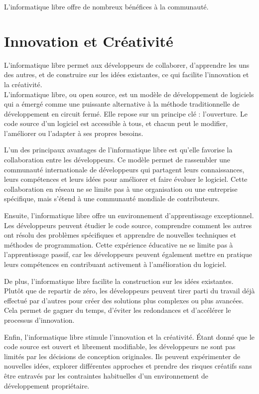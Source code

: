 L'informatique libre offre de nombreux bénéfices à la communauté.

\section{Innovation et Créativité}
L'informatique libre permet aux développeurs de collaborer, d'apprendre les uns des autres, et de construire sur les idées existantes, ce qui facilite l'innovation et la créativité.\\

L'informatique libre, ou open source, est un modèle de développement de logiciels qui a émergé comme une puissante alternative à la méthode traditionnelle de développement en circuit fermé. Elle repose sur un principe clé : l'ouverture. Le code source d'un logiciel est accessible à tous, et chacun peut le modifier, l'améliorer ou l'adapter à ses propres besoins.

L'un des principaux avantages de l'informatique libre est qu'elle favorise la collaboration entre les développeurs. Ce modèle permet de rassembler une communauté internationale de développeurs qui partagent leurs connaissances, leurs compétences et leurs idées pour améliorer et faire évoluer le logiciel. Cette collaboration en réseau ne se limite pas à une organisation ou une entreprise spécifique, mais s'étend à une communauté mondiale de contributeurs.

Ensuite, l'informatique libre offre un environnement d'apprentissage exceptionnel. Les développeurs peuvent étudier le code source, comprendre comment les autres ont résolu des problèmes spécifiques et apprendre de nouvelles techniques et méthodes de programmation. Cette expérience éducative ne se limite pas à l'apprentissage passif, car les développeurs peuvent également mettre en pratique leurs compétences en contribuant activement à l'amélioration du logiciel.

De plus, l'informatique libre facilite la construction sur les idées existantes. Plutôt que de repartir de zéro, les développeurs peuvent tirer parti du travail déjà effectué par d'autres pour créer des solutions plus complexes ou plus avancées. Cela permet de gagner du temps, d'éviter les redondances et d'accélérer le processus d'innovation.

Enfin, l'informatique libre stimule l'innovation et la créativité. Étant donné que le code source est ouvert et librement modifiable, les développeurs ne sont pas limités par les décisions de conception originales. Ils peuvent expérimenter de nouvelles idées, explorer différentes approches et prendre des risques créatifs sans être entravés par les contraintes habituelles d'un environnement de développement propriétaire.

